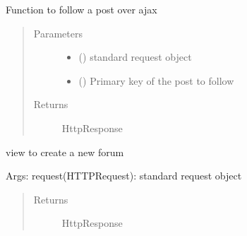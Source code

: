 \documentclass[letterpaper,10pt,english]{sphinxmanual}
\begin{document}

\begin{fulllineitems}
\label{\detokenize{forums:forums.views.follow_post_ajax}}
Function to follow a post over ajax
\begin{quote}\begin{description}
\item[{Parameters}] \leavevmode\begin{itemize}
\item {} 
 () \textendash{} standard request object

\item {} 
 () \textendash{} Primary key of the post to follow

\end{itemize}

\item[{Returns}] \leavevmode
HttpResponse

\end{description}\end{quote}

\end{fulllineitems}


\begin{fulllineitems}
\label{\detokenize{forums:forums.views.forum_create}}
view to create a new forum

Args: request(HTTPRequest): standard request object
\begin{quote}\begin{description}
\item[{Returns}] \leavevmode
HttpResponse

\end{description}\end{quote}

\end{fulllineitems}
\end{document}
